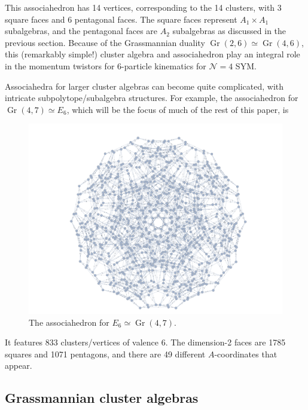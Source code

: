 \documentclass[11pt]{article}
\DeclareMathOperator{\Gr}{Gr}
\def\draftnote#1{{\bf [#1]}}
\begin{document}
\noindent \draftnote{create new version} This associahedron has 14 vertices, corresponding to the 14 clusters, with 3 square faces and 6 pentagonal faces. The square faces represent $A_1\times A_1$ subalgebras, and the pentagonal faces are $A_2$ subalgebras as discussed in the previous section. Because of the Grassmannian duality $\Gr(2,6) \simeq \Gr(4,6)$, this (remarkably simple!) cluster algebra and associahedron play an integral role in the momentum twistors for 6-particle kinematics for $\mathcal{N}=4$ SYM. 

Associahedra for larger cluster algebras can become quite complicated, with intricate subpolytope/subalgebra structures. For example, the associahedron for $\Gr(4,7)\simeq E_6$, which will be the focus of much of the rest of this paper, is

\begin{figure}[h!]\label{fig:e6-poly}
  \centering
  \includegraphics[scale=0.25]{e6-associahedron}
  \caption{The associahedron for $E_6\simeq\Gr(4,7)$.}
\end{figure}
\noindent It features 833 clusters/vertices of valence 6. The dimension-2 faces are 1785 squares and 1071 pentagons, and there are 49 different $A$-coordinates that appear. 

\subsection{Grassmannian cluster algebras}
\end{document}
